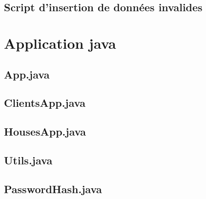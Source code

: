 \documentclass[11pt,a4paper]{report}
\begin{document}
\section{Script d'insertion de données invalides}

\newpage

\chapter{Application java}
\section{App.java}

\newpage

\section{ClientsApp.java}

\newpage

\section{HousesApp.java}

\newpage

\section{Utils.java}

\newpage

\section{PasswordHash.java}

\newpage

\setlength{\parskip}{\baselineskip}
\end{document}
